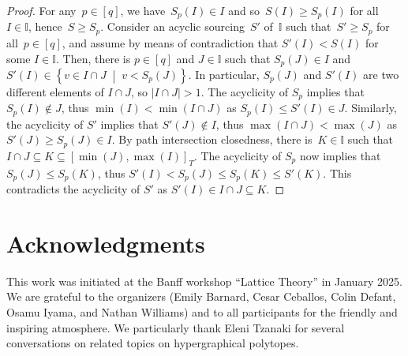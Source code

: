 \documentclass{amsart}
\theoremstyle{definition}
\newcommand{\set}[2]{\left\{ #1 \;\middle|\; #2 \right\}} %
\newcommand{\II}{\mathbb I} %
\begin{document}
\begin{proof}
For any~$p \in [q]$, we have~$S_p(I) \in I$ and so~$S(I) \ge S_p(I)$ for all~$I \in \II$, hence~$S \ge S_p$.
Consider an acyclic sourcing~$S'$ of~$\II$ such that~$S' \ge S_p$ for all~$p \in [q]$,
and assume by means of contradiction that $S'(I) < S(I)$ for some $I \in \II$.
Then, there is $p \in [q]$ and $J \in \II$ such that $S_p(J) \in I$ and $S'(I) \in \set{v \in I \cap J}{v < S_p(J)}$.
In particular, $S_p(J)$ and $S'(I)$ are two different elements of $I \cap J$, so $|I \cap J| > 1$.
The acyclicity of $S_p$ implies that $S_p(I) \notin J$, thus $\min(I) < \min(I \cap J)$ as $S_p(I) \leq S'(I) \in J$.
Similarly, the acyclicity of $S'$ implies that $S'(J) \notin I$, thus $\max(I \cap J) < \max(J)$ as $S'(J) \geq S_p(J) \in I$.
By path intersection closedness, there is~$K \in \II$ such that $I \cap J \subseteq K \subseteq [\min(J),\max(I)]_T$.
The acyclicity of $S_p$ now implies that $S_p(J) \leq S_p(K)$, thus $S'(I) < S_p(J) \leq S_p(K) \leq S'(K)$.
This contradicts the acyclicity of $S'$ as $S'(I) \in I \cap J \subseteq K$.
\end{proof}


\section*{Acknowledgments}

This work was initiated at the Banff workshop ``Lattice Theory'' in January 2025.
We are grateful to the organizers (Emily Barnard, Cesar Ceballos, Colin Defant, Osamu Iyama, and Nathan Williams) and to all participants for the friendly and inspiring atmosphere.
We particularly thank Eleni Tzanaki for several conversations on related topics on hypergraphical polytopes.




\label{sec:biblio}

\end{document}
